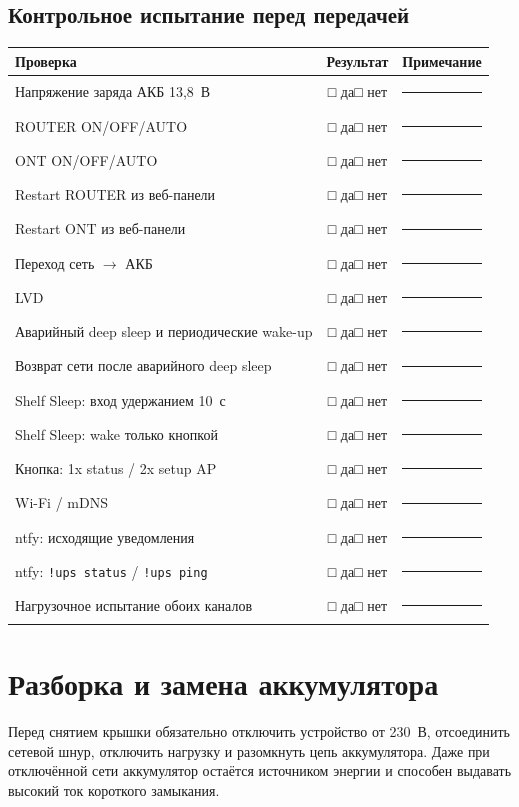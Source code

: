 \documentclass[11pt,a4paper]{article}
\newcommand{\yesno}{□ да\quad □ нет}
\begin{document}
\subsection{Контрольное испытание перед передачей}
\begin{tabularx}{\textwidth}{@{}XcX@{}}
\toprule
\textbf{Проверка} & \textbf{Результат} & \textbf{Примечание} \\
\midrule
Напряжение заряда АКБ 13,8~В & \yesno & \rule{40mm}{0.4pt} \\
ROUTER ON/OFF/AUTO & \yesno & \rule{40mm}{0.4pt} \\
ONT ON/OFF/AUTO & \yesno & \rule{40mm}{0.4pt} \\
Restart ROUTER из веб-панели & \yesno & \rule{40mm}{0.4pt} \\
Restart ONT из веб-панели & \yesno & \rule{40mm}{0.4pt} \\
Переход сеть $\rightarrow$ АКБ & \yesno & \rule{40mm}{0.4pt} \\
LVD & \yesno & \rule{40mm}{0.4pt} \\
Аварийный deep sleep и периодические wake-up & \yesno & \rule{40mm}{0.4pt} \\
Возврат сети после аварийного deep sleep & \yesno & \rule{40mm}{0.4pt} \\
Shelf Sleep: вход удержанием 10~с & \yesno & \rule{40mm}{0.4pt} \\
Shelf Sleep: wake только кнопкой & \yesno & \rule{40mm}{0.4pt} \\
Кнопка: 1x status / 2x setup AP & \yesno & \rule{40mm}{0.4pt} \\
Wi-Fi / mDNS & \yesno & \rule{40mm}{0.4pt} \\
ntfy: исходящие уведомления & \yesno & \rule{40mm}{0.4pt} \\
ntfy: \texttt{!ups status} / \texttt{!ups ping} & \yesno & \rule{40mm}{0.4pt} \\
Нагрузочное испытание обоих каналов & \yesno & \rule{40mm}{0.4pt} \\
\bottomrule
\end{tabularx}

\section{Разборка и замена аккумулятора}

\begin{tcolorbox}[colback=lightwarn,colframe=warn,title=Опасное напряжение]
Перед снятием крышки обязательно отключить устройство от 230~В, отсоединить сетевой шнур, отключить нагрузку и разомкнуть цепь аккумулятора. Даже при отключённой сети аккумулятор остаётся источником энергии и способен выдавать высокий ток короткого замыкания.
\end{tcolorbox}
\end{document}
